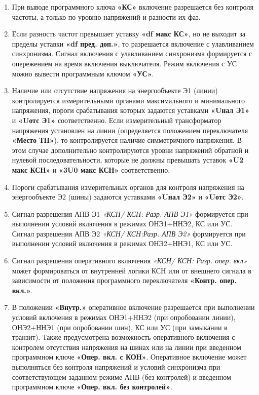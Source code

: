 \begin{enumerate}
\item
При выводе программного ключа \textbf{«КС»} включение разрешается без контроля частоты, а только по уровню напряжений и разности их фаз.

\item
Если разность частот превышает уставку \textbf{«df макс КС»}, но не выходит за пределы уставки \textbf{«df пред. доп.»}, то разрешается включение с улавливанием синхронизма. Сигнал включения с улавливанием синхронизма формируется с опережением на время включения выключателя. Режим включения с УС можно вывести программным ключом \textbf{«УС»}.

\item
Наличие или отсутствие напряжения на энергообъекте Э1 (линии) контролируется измерительными органами максимального и минимального напряжения, пороги срабатывания которых задаются уставками \textbf{«Uнал Э1»} и \textbf{«Uотс Э1»} соответственно. Если измерительный трансформатор напряжения установлен на линии (определяется положением переключателя \textbf{«Место ТН»}), то контролируется наличие симметричного напряжения. В этом случае дополнительно контролируются уровни напряжений обратной и нулевой последовательности, которые не должны превышать уставок \textbf{«U2 макс КСН»} и \textbf{«3U0 макс КСН»} соответственно.

\item
Пороги срабатывания измерительных органов для контроля напряжения на энергообъекте Э2 (шины) задаются уставками \textbf{«Uнал Э2»} и \textbf{«Uотс Э2»}.

\item
Сигнал разрешения АПВ Э1 \textit{«КСН/ КСН: Разр. АПВ Э1»} формируется при выполнении условий включения в режимах ОНЭ1+ННЭ2, КС или УС. Сигнал разрешения АПВ Э2 \textit{«КСН/ КСН:Разр. АПВ Э2»} формируется при выполнении условий включения в режимах ОНЭ2+ННЭ1, КС или УС. 

\item
Сигнал разрешения оперативного включения \textit{«КСН/ КСН: Разр. опер. вкл»} может формироваться от внутренней логики КСН или от внешнего сигнала в зависимости от положения программного переключателя \textbf{«Контр. опер. вкл.»}.

\item
В положении \textbf{«Внутр.»} оперативное включение разрешается при выполнении условий включения в режимах ОНЭ1+ННЭ2 (при опробовании линии), ОНЭ2+ННЭ1 (при опробовании шин), КС или УС (при замыкании в транзит). Также предусмотрена возможность оперативного включения с контролем отсутствия напряжения на шинах или на линии при введенном программном ключе \textbf{«Опер. вкл. с КОН»}. Оперативное включение может выполняться без контроля напряжений и условий синхронизма при соответствующем заданном режиме АПВ (без контролей) и введенном программном ключе \textbf{«Опер. вкл. без контролей»}.


\end{enumerate}
